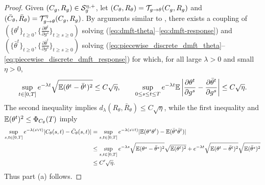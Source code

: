 \begin{proof}
Given $(C_g,R_g) \in \mathcal{S}_g^{\eta,+}$, let $(C_\theta,R_\theta)=\mathcal{T}_{g \to
\theta}(C_g,R_g)$ and $(\bar C_\theta,\bar R_\theta)=\mathcal{T}_{g \to
\theta}^\eta(C_g,R_g)$.
By arguments similar to \cite[Lemma 4.4]{fan2025dynamicalI}, there exists a
coupling of $(\{\theta^t\}_{t \geq 0},\{\frac{\partial \theta^t}{\partial
g^s}\}_{t \geq s \geq 0})$ solving (\ref{eq:dmft-theta}--\ref{eq:dmft-response})
and $(\{\bar\theta^t\}_{t \geq 0},\{\frac{\partial \bar\theta^t}{\partial
g^s}\}_{t \geq s \geq 0})$ solving
(\ref{eq:piecewise_discrete_dmft_theta}--\ref{eq:piecewise_discrete_dmft_response})
for which, for all large $\lambda>0$ and small $\eta>0$,
\[\sup_{t \in [0,T]} e^{-\lambda t} \sqrt{\mathbb{E}(\theta^t-\bar \theta^t)^2}
\leq C\sqrt{\eta},
\qquad \sup_{0 \leq s \leq t \leq T}
e^{-\lambda t}\mathbb{E}\left|\frac{\partial \theta^t}{\partial g^s}
-\frac{\partial \bar\theta^t}{\partial g^s}\right| \leq C\sqrt{\eta}.\]
The second inequality implies $d_\lambda(R_\theta,\bar R_\theta) \leq
C\sqrt{\eta}$, while the first inequality and $\mathbb{E}(\theta^t)^2 \leq \Phi_{C_\theta}(T)$
imply
\begin{align*}
\sup_{s,t \in [0,T]} e^{-\lambda (s \vee t)}|C_\theta(s,t)-\bar C_\theta(s,t)|
&=\sup_{s,t \in [0,T]} e^{-\lambda (s \vee
t)}|\mathbb{E}(\theta^s\theta^t)-\mathbb{E}(\bar\theta^s\bar \theta^t)|\\
&\leq \sup_{s,t \in [0,T]} e^{-\lambda s}\sqrt{\mathbb{E}(\theta^s-\bar \theta^s)^2}
\sqrt{\mathbb{E}(\theta^t)^2}
+e^{-\lambda t}\sqrt{\mathbb{E}(\theta^t-\bar \theta^t)^2}
\sqrt{\mathbb{E}(\bar\theta^s)^2}\\
& \leq C'\sqrt{\eta}.
\end{align*}
Thus part (a) follows.


\end{proof}
